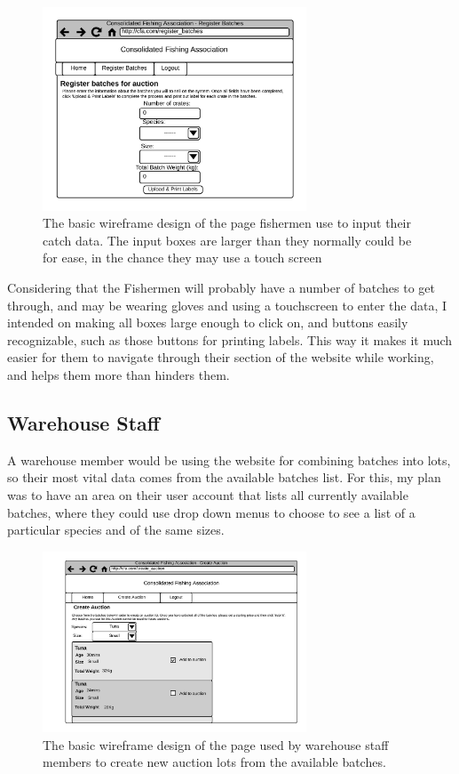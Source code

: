 \documentclass{article}
\begin{document}
\begin{figure}[H]
	\centering
	\includegraphics[width=0.7\textwidth]{img/wf2.png}
	\caption{The basic wireframe design of the page fishermen use to input their catch data. The input boxes are larger than they normally could be for ease, in the chance they may use a touch screen}
\end{figure}

Considering that the Fishermen will probably have a number of batches to get through, and may be wearing gloves and using a touchscreen to enter the data, I intended on making all boxes large enough to click on, and buttons easily recognizable, such as those buttons for printing labels. This way it makes it much easier for them to navigate through their section of the website while working, and helps them more than hinders them.

\subsection{Warehouse Staff}

A warehouse member would be using the website for combining batches into lots, so their most vital data comes from the available batches list. For this, my plan was to have an area on their user account that lists all currently available batches, where they could use drop down menus to choose to see a list of a particular species and of the same sizes.

\begin{figure}[H]
	\centering
	\includegraphics[width=0.7\textwidth]{img/wf3.png}
	\caption{The basic wireframe design of the page used by warehouse staff members to create new auction lots from the available batches.}
\end{figure}
\end{document}
